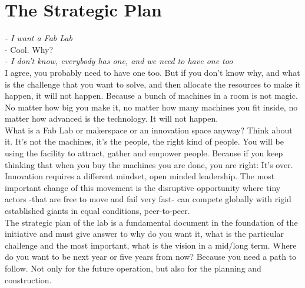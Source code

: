 \documentclass[a4paper,12pt,titlepage]{article}
\begin{document}
\section{The Strategic Plan}
\textit{- I want a Fab Lab}\\ 
- Cool. Why?\\ 
\textit{- I don't know, everybody has one, and we need to have one too}\\ 

I agree, you probably need to have one too. But if you don't know why, and what is the challenge that you want to solve, and then allocate the resources to make it happen, it will not happen. Because a bunch of machines in a room is not magic. No matter how big you make it, no matter how many machines you fit inside, no matter how advanced is the technology. It will not happen.\\ 

What is a Fab Lab or makerspace or an innovation space anyway? Think about it. It's not the machines, it's the people, the right kind of people. You will be using the facility to attract, gather and empower people. Because if you keep thinking that when you buy the machines you are done, you are right: It's over. Innovation requires a different mindset, open minded leadership. The most important change of this movement is the disruptive opportunity where tiny actors -that are free to move and fail very fast- can compete globally with rigid established giants in equal conditions, peer-to-peer.\\  

The strategic plan of the lab is a fundamental document in the foundation of the initiative and must give answer to why do you want it, what is the particular challenge and the most important, what is the vision in a mid/long term. Where do you want to be next year or five years from now? Because you need a path to follow. Not only for the future operation, but also for the planning and construction. 
\end{document}
